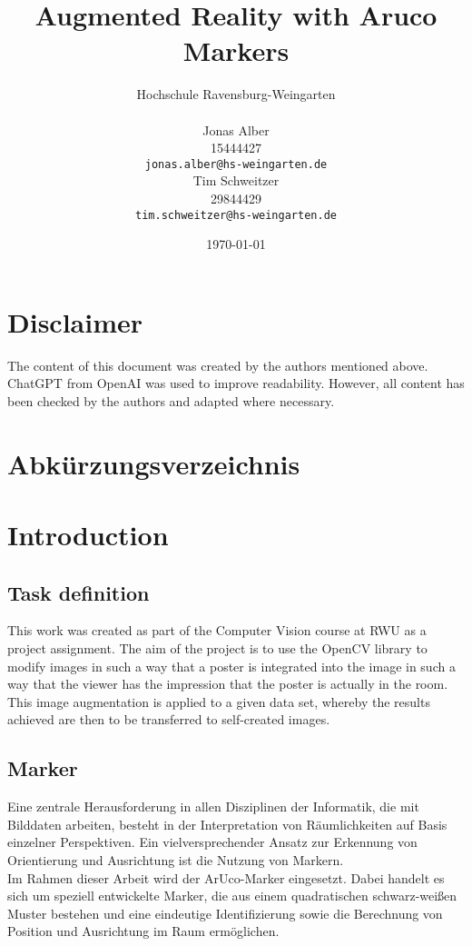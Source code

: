 \documentclass[a4paper,twocolumn]{article}
\title{Augmented Reality with Aruco Markers}
\author{
    Hochschule Ravensburg-Weingarten \\[1em] %
    \begin{minipage}[t]{0.45\textwidth} %
        \centering
        Jonas Alber \\ %
        15444427\\
        \texttt{jonas.alber@hs-weingarten.de} %
    \end{minipage}
    \hfill
    \begin{minipage}[t]{0.45\textwidth} %
        \centering
        Tim Schweitzer \\  29844429 \\ %
        \texttt{tim.schweitzer@hs-weingarten.de} %
    \end{minipage}
}
\date{\today}
\begin{document}
\maketitle

\section*{Disclaimer}
The content of this document was created by the authors mentioned above. ChatGPT from OpenAI was used to improve readability. However, all content has been checked by the authors and adapted where necessary.


\section*{Abkürzungsverzeichnis}
\begin{acronym}[RWU]
\end{acronym}

\begin{abstract}

\end{abstract}

\section{Introduction}

\subsection{Task definition}
This work was created as part of the Computer Vision course at \ac{RWU} as a project assignment. The aim of the project is to use the OpenCV library to modify images in such a way that a poster is integrated into the image in such a way that the viewer has the impression that the poster is actually in the room.
\\
This image augmentation is applied to a given data set, whereby the results achieved are then to be transferred to self-created images.
\subsection{Marker}
Eine zentrale Herausforderung in allen Disziplinen der Informatik, die mit Bilddaten arbeiten, besteht in der Interpretation von Räumlichkeiten auf Basis einzelner Perspektiven. Ein vielversprechender Ansatz zur Erkennung von Orientierung und Ausrichtung ist die Nutzung von Markern.
\\
Im Rahmen dieser Arbeit wird der ArUco-Marker eingesetzt. Dabei handelt es sich um speziell entwickelte Marker, die aus einem quadratischen schwarz-weißen Muster bestehen und eine eindeutige Identifizierung sowie die Berechnung von Position und Ausrichtung im Raum ermöglichen. \cite{aruco1}
\end{document}
